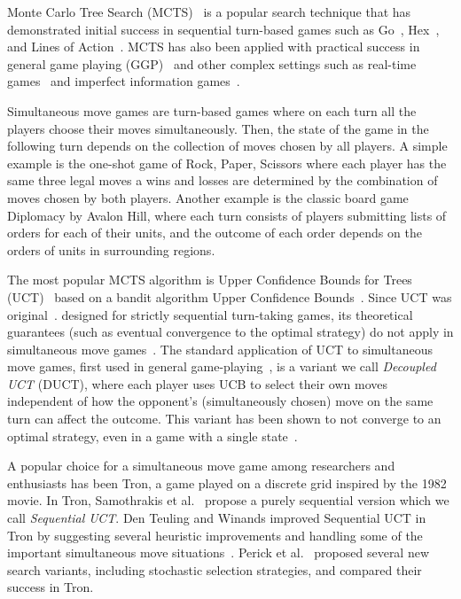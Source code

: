 \documentclass[conference]{IEEEtran}
\begin{document}
Monte Carlo Tree Search (MCTS)~\cite{Coulom06Efficient,Kocsis06Bandit} is a popular search technique 
that has demonstrated initial success in sequential turn-based games such as Go~\cite{Gelly12}, Hex~\cite{Arneson10Hex},
and Lines of Action~\cite{Winands10MCTS-LOA}. MCTS has also been applied with practical success in general game playing 
(GGP)~\cite{Bjornsson09CadiaPlayer} and other complex settings such as real-time 
games~\cite{Balla09UCT,Pepels14Monte} 
and imperfect information games~\cite{Buro09Improving,Cowling12ISMCTS}.

Simultaneous move games are turn-based games where on each turn all the players choose their moves simultaneously.
Then, the state of the game in the following turn depends on the collection of moves chosen by all players. 
A simple example is the one-shot game of Rock, Paper, Scissors where each player has the same three legal moves 
a wins and losses are determined by the combination of moves chosen by both players. 
Another example is the classic board game Diplomacy by Avalon Hill, where each turn consists of players submitting 
lists of orders for each of their units, and the outcome of each order depends on the orders of units in surrounding regions. 

The most popular MCTS algorithm is Upper Confidence Bounds for Trees (UCT)~\cite{Kocsis06Bandit} based on a bandit algorithm 
Upper Confidence Bounds~\cite{Auer02Finite}. Since UCT was original~\cite{Shafiei09}. 
designed for strictly sequential turn-taking games, its theoretical guarantees (such as eventual convergence to the optimal 
strategy) do not apply in simultaneous move games~\cite{Shafiei09}. The standard application of UCT to simultaneous move games, 
first used in general game-playing~\cite{Cadiaplayer}, is a variant we call {\it Decoupled UCT} (DUCT), where each player uses UCB to select 
their own moves independent of how the opponent's (simultaneously chosen) move on the same turn can affect the outcome. 
This variant has been shown to not converge to an optimal strategy, even in a game with a single state~\cite{Shafiei09}.

A popular choice for a simultaneous move game among researchers and enthusiasts has been Tron, a game played on a discrete 
grid inspired by the 1982 movie.
In Tron, Samothrakis et al.~\cite{Samothrakis10Tron} propose a purely sequential version which we call {\it Sequential UCT}. 
Den Teuling and Winands improved Sequential UCT in Tron by suggesting several heuristic improvements and handling some of the 
important simultaneous move situations~\cite{DenTeuling12Tron}. Perick et al.~\cite{Perick12Comparison} proposed several new 
search variants, including stochastic selection strategies, and compared their success in Tron. 
\end{document}
